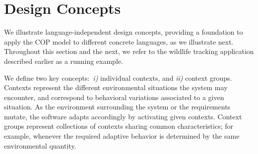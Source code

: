 \section{Design Concepts}\label{sec:appdesign}

We illustrate language-independent design concepts, providing a
foundation to apply the COP model to different concrete languages, as
we illustrate next. Throughout this section and the next, we refer to
the wildlife tracking application described earlier as a running
example.

We define two key concepts:~\emph{i)} individual contexts, and
\emph{ii)} context groups. Contexts represent the different
environmental situations the system may encounter, and correspond to
behavioral variations associated to a given situation. As the
environment surrounding the system or the requirements mutate, the
software adapts accordingly by activating given contexts. Context
groups represent collections of contexts sharing common
characteristics; for example, whenever the required adaptive behavior
is determined by the same environmental quantity. 



